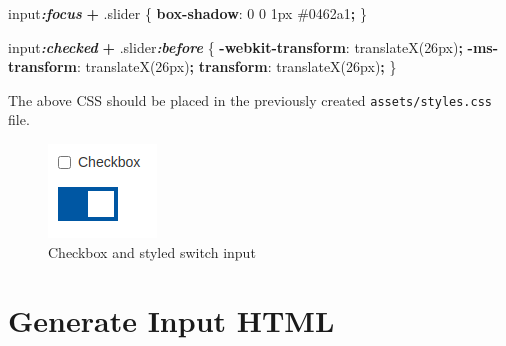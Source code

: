 \documentclass[
]{krantz}
\makeatletter
\newenvironment{Shaded}{\begin{snugshade}}{\end{snugshade}}
\newcommand{\ConstantTok}[1]{\textcolor[rgb]{0,0,0}{#1}}
\newcommand{\DataTypeTok}[1]{\textcolor[rgb]{0.27,0.27,0.27}{#1}}
\newcommand{\DecValTok}[1]{\textcolor[rgb]{0.06,0.06,0.06}{#1}}
\newcommand{\FunctionTok}[1]{\textcolor[rgb]{0,0,0}{#1}}
\newcommand{\InformationTok}[1]{\textcolor[rgb]{0.37,0.37,0.37}{\textbf{\textit{#1}}}}
\newcommand{\KeywordTok}[1]{\textcolor[rgb]{0.27,0.27,0.27}{\textbf{#1}}}
\newcommand{\NormalTok}[1]{#1}
\newcommand{\OperatorTok}[1]{\textcolor[rgb]{0.43,0.43,0.43}{\textbf{#1}}}
\newenvironment{kframe}{%
\medskip{}
\setlength{\fboxsep}{.8em}
 \def\at@end@of@kframe{}%
 \ifinner\ifhmode%
  \def\at@end@of@kframe{\end{minipage}}%
  \begin{minipage}{\columnwidth}%
 \fi\fi%
 \def\FrameCommand##1{\hskip\@totalleftmargin \hskip-\fboxsep
 \colorbox{shadecolor}{##1}\hskip-\fboxsep
     \hskip-\linewidth \hskip-\@totalleftmargin \hskip\columnwidth}%
 \MakeFramed {\advance\hsize-\width
   \@totalleftmargin\z@ \linewidth\hsize
   \@setminipage}}%
 {\par\unskip\endMakeFramed%
 \at@end@of@kframe}
\renewenvironment{Shaded}{\begin{kframe}}{\end{kframe}}
\makeatother
\begin{document}
\begin{Shaded}
\begin{Highlighting}[]
\NormalTok{input}\InformationTok{:focus} \OperatorTok{+} \FunctionTok{.slider}\NormalTok{ \{}
  \KeywordTok{box{-}shadow}\NormalTok{: }\DecValTok{0} \DecValTok{0} \DecValTok{1}\DataTypeTok{px} \ConstantTok{\#0462a1}\OperatorTok{;}
\NormalTok{\}}

\NormalTok{input}\InformationTok{:checked} \OperatorTok{+} \FunctionTok{.slider}\InformationTok{:before}\NormalTok{ \{}
  \KeywordTok{{-}webkit{-}transform}\NormalTok{: translateX(}\DecValTok{26}\DataTypeTok{px}\NormalTok{)}\OperatorTok{;}
  \KeywordTok{{-}ms{-}transform}\NormalTok{: translateX(}\DecValTok{26}\DataTypeTok{px}\NormalTok{)}\OperatorTok{;}
  \KeywordTok{transform}\NormalTok{: translateX(}\DecValTok{26}\DataTypeTok{px}\NormalTok{)}\OperatorTok{;}
\NormalTok{\}}
\end{Highlighting}
\end{Shaded}

The above CSS should be placed in the previously created \texttt{assets/styles.css} file.

\begin{figure}[t]

{\centering \includegraphics[width=1\linewidth]{images/checkbox-switch} 

}

\caption{Checkbox and styled switch input}\label{fig:checkbox-switch}
\end{figure}

\hypertarget{shiny-input-html}{%
\section{Generate Input HTML}\label{shiny-input-html}}
\end{document}
